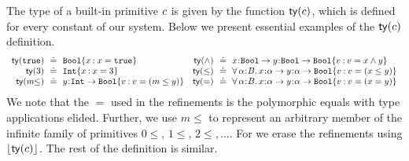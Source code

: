%
The type of a built-in primitive $c$ is given by
the function ${\mathsf{ty}}(c)$, which is defined for every
constant of our system. Below we present essential
examples of the ${\mathsf{ty}}(c)$ definition.
%
{\small
$$\begin{array}{rclrcl}
\ty{\ttrue} & \!\!\defeq\!\! & \breft{\tbool}{x}{x = \ttrue} &
 \ty{\wedge} & \!\!\defeq\!\! & \functype{x}{\tbool}{\functype{y}{\tbool}{\breft{\tbool}{v}{v = x \wedge y}}} \\
\ty{3} & \!\!\defeq\!\!& \breft{\tint}{x}{x = 3} &
\ty{\leq} & \!\!\defeq\!\! & \polytype{\al}{\skbase}{\functype{x}{\al}{\functype{y}{\al}{\breft{\tbool}{v}{v = (x \leq y)}}}} \\
\ty{m\!\!\leq} & \!\!\defeq\!\! & \functype{y}{\tint}{\breft{\tbool}{v}{v = (m \leq y)}} & 
\ty{=} & \!\!\defeq\!\! & \polytype{\tvar}{\skbase}{\functype{x}{\al}{\functype{y}{\al}{\breft{\tbool}{v}{v = (x = y)}}}}
\end{array}$$
}
We note that the $=$ used in the refinements is the polymorphic
equals with type applications elided.
%
Further, we use $m\!\!\leq$ to represent
an arbitrary member of the infinite family
of primitives $0\!\!\leq,\, 1\!\!\leq,\, 2\!\!\leq,\ldots$.
%
For \sysf we erase the refinements
using $\lfloor{{\mathsf{ty}}(\ensuremath{c})}\rfloor$.
%
The rest of the definition is similar.

